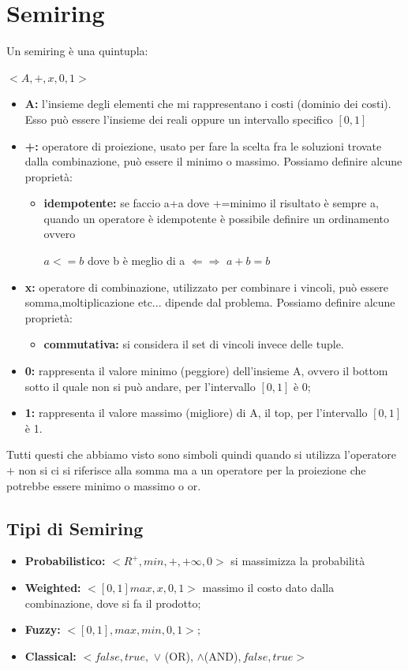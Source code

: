 \section{Semiring}
Un semiring è una quintupla:
\begin{center}
    $<A, +, x, 0, 1>$
\end{center}
\begin{itemize}
    \item \textbf{A:} l'insieme degli elementi che mi rappresentano i costi (dominio dei costi). Esso può essere l'insieme dei reali oppure un intervallo specifico $[0,1]$
    \item \textbf{+:} operatore di proiezione, usato per fare la scelta fra le soluzioni trovate dalla combinazione, può essere il minimo o massimo. Possiamo definire alcune proprietà:
          \begin{itemize}
              \item \textbf{idempotente:} se faccio a+a dove +=minimo il risultato è sempre a, quando un operatore è idempotente è possibile definire un ordinamento ovvero
                    \begin{center}
                        $a <= b$ dove b è meglio di a $\Leftarrow \Rightarrow$ $a + b = b$
                    \end{center}
          \end{itemize}
    \item \textbf{x:} operatore di combinazione, utilizzato per combinare i vincoli, può essere somma,moltiplicazione etc... dipende dal problema. Possiamo definire alcune proprietà:
          \begin{itemize}
              \item \textbf{commutativa:} si considera il set di vincoli invece delle tuple.
          \end{itemize}
    \item \textbf{0:} rappresenta il valore minimo (peggiore) dell'insieme A, ovvero il bottom sotto il quale non si può andare, per l'intervallo $[0,1]$ è 0;
    \item \textbf{1:} rappresenta il valore massimo (migliore) di A, il top, per l'intervallo $[0,1]$ è 1.
\end{itemize}
Tutti questi che abbiamo visto sono simboli quindi quando si utilizza l'operatore $+$ non si ci si riferisce alla somma ma a un operatore per la proiezione che potrebbe essere minimo o massimo o or.
\subsection{Tipi di Semiring}
\begin{itemize}
    \item \textbf{Probabilistico:} $< R^+ , min, +, +\infty, 0>$ si massimizza la probabilità
    \item \textbf{Weighted:} $<[0, 1] max,x,0,1>$ massimo il costo dato dalla combinazione, dove si fa il prodotto;
    \item \textbf{Fuzzy:} $<[0,1],max,min,0,1>;$
    \item \textbf{Classical:} $<{false,true},$ $\lor$ (OR), $\land$(AND)$, false, true>$
\end{itemize}

